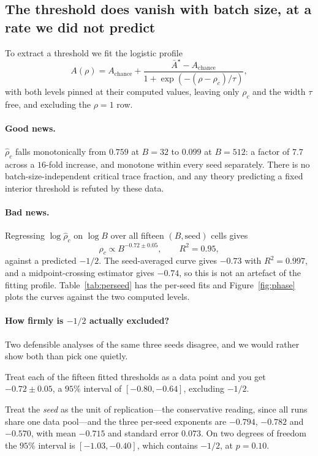 \documentclass{article}
\theoremstyle{plain}
\theoremstyle{definition}
\theoremstyle{remark}
\newcommand{\1}{\mathbf{1}}
\begin{document}
\subsection{The threshold does vanish with batch size, at a rate we did not predict}
\label{sec:exponent}

To extract a threshold we fit the logistic profile
\[
A(\rho) = A_{\mathrm{chance}} + \frac{\bar A^\star-A_{\mathrm{chance}}}
{1+\exp(-(\rho-\rho_c)/\tau)},
\]
with both levels pinned at their computed values, leaving only $\rho_c$ and the
width $\tau$ free, and excluding the $\rho=1$ row.

\paragraph{Good news.}
$\hat\rho_c$ falls monotonically from $0.759$ at $B=32$ to $0.099$ at $B=512$: a
factor of $7.7$ across a $16$-fold increase, and monotone within every seed
separately. There is no batch-size-independent critical trace fraction, and any
theory predicting a fixed interior threshold is refuted by these data.

\paragraph{Bad news.}
Regressing $\log\hat\rho_c$ on $\log B$ over all fifteen $(B,\mathrm{seed})$
cells gives
\begin{equation}
\label{eq:measured}
\hat\rho_c \propto B^{-0.72\pm0.05},\qquad R^2 = 0.95,
\end{equation}
against a predicted $-1/2$. The seed-averaged curve gives $-0.73$ with
$R^2 = 0.997$, and a midpoint-crossing estimator gives $-0.74$, so this is not an
artefact of the fitting profile. Table~\ref{tab:perseed} has the per-seed fits
and Figure~\ref{fig:phase} plots the curves against the two computed levels.

\paragraph{How firmly is $-1/2$ actually excluded?}
Two defensible analyses of the same three seeds disagree, and we would rather
show both than pick one quietly.

Treat each of the fifteen fitted thresholds as a data point and you get
$-0.72\pm0.05$, a $95\%$ interval of $[-0.80,-0.64]$, excluding $-1/2$.

Treat the \emph{seed} as the unit of replication---the conservative reading,
since all runs share one data pool---and the three per-seed exponents are
$-0.794$, $-0.782$ and $-0.570$, with mean $-0.715$ and standard error $0.073$.
On two degrees of freedom the $95\%$ interval is $[-1.03,-0.40]$, which contains
$-1/2$, at $p=0.10$.
\end{document}
